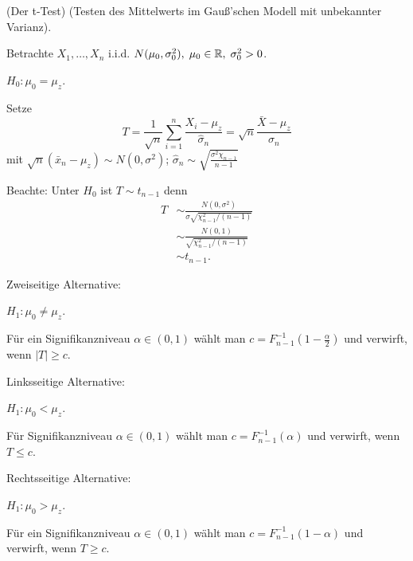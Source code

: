 \documentclass{tstextbook}
\begin{document}
\begin{example}(Der t-Test)
	(Testen des Mittelwerts im Gauß'schen Modell mit unbekannter Varianz).
	
		Betrachte $ X_1,\ldots,X_n $ i.i.d. $ N(\mu_0,\sigma_0^2), \; \mu_0\in\mathbb R, \;\sigma_0^2>0 $. 
	
	$ H_0\colon \mu_0=\mu_z $. 
	
	Setze \[ T = \frac{1}{\sqrt{n}}\sum_{i=1}^{n}\frac{X_i-\mu_z}{\hat{\sigma}_n} = \sqrt{n}\frac{\bar{X}-\mu_z}{\hat{\sigma}_n} \] mit $\sqrt{n}(\bar{x}_n-\mu_z)\sim N(0,\sigma^2)$; $\hat{\sigma}_n\sim \sqrt{\frac{\sigma^2\chi_{n-1}}{n-1}}$
	
	Beachte: Unter $ H_0 $ ist $ T\sim t_{n-1} $ denn
	\[
	\begin{aligned}
	    T & \sim \frac{N(0,\sigma^2)}{\sigma\sqrt{\chi_{n-1}^2/(n-1)}} \\
	    & \sim \frac{N(0,1)}{\sqrt{\chi_{n-1}^2/(n-1)}} \\
	    & \sim t_{n-1}.
	\end{aligned}
	\]
	
	Zweiseitige Alternative:
	
	$ H_1\colon \mu_0\ne\mu_z $.
	
	Für ein Signifikanzniveau $ \alpha\in(0,1) $ wählt man $ c=F_{n-1}^{-1}\left(1-\frac{\alpha}{2}\right) $ und verwirft, wenn $ |T|\ge c $. 
	
	Linksseitige Alternative: 
	
	$ H_1\colon \mu_0 < \mu_z $. 
	
	Für Signifikanzniveau $ \alpha\in(0,1) $ wählt man $ c=F_{n-1}^{-1}(\alpha) $ und verwirft, wenn $ T\le c $. 
	
	Rechtsseitige Alternative:
	
	$H_1\colon \mu_0 > \mu_z $.
	
	Für ein Signifikanzniveau $ \alpha\in(0,1) $ wählt man $ c=F_{n-1}^{-1}\left(1-\alpha\right) $ und verwirft, wenn $ T\ge c $.
	
	
\end{example}
\end{document}
